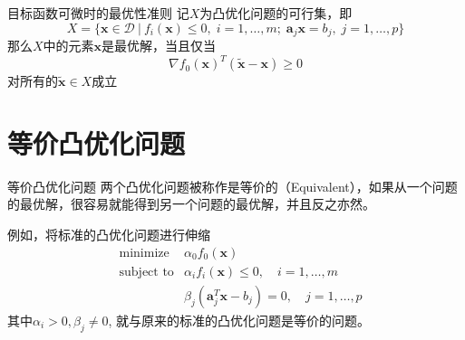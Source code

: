 
\begin{frame}

\begin{block}{目标函数可微时的最优性准则}
记$X$为凸优化问题的可行集，即
\[X = \{ \mathbf{x} \in \mathcal{D} \ |\ f_i(\mathbf{x}) \le 0, \; i = 1,\ldots,m;\; \mathbf{a}_j\mathbf{x} = b_j, \; j=1,\ldots,p \}\]
那么$X$中的元素$\mathbf{x}$是最优解，当且仅当
\[\nabla f_0(\mathbf{x})^T(\widetilde{\mathbf{x}} - \mathbf{x}) \ge 0\]
对所有的$\widetilde{\mathbf{x}} \in X$成立
\end{block}

\end{frame}


\section{等价凸优化问题}


\begin{frame}

\begin{block}{等价凸优化问题}
两个凸优化问题被称作是等价的（Equivalent），如果从一个问题的最优解，很容易就能得到另一个问题的最优解，并且反之亦然。
\end{block}

\vspace{1em}

例如，将标准的凸优化问题进行伸缩
\begin{eqnarray*}
& \text{minimize} & \alpha_0f_0(\mathbf{x}) \\
& \text{subject to} & \alpha_i f_i(\mathbf{x}) \le 0, \quad i = 1,\ldots,m \\
& & \beta_j(\mathbf{a}_j^T\mathbf{x} - b_j) = 0, \quad j = 1,\ldots,p
\end{eqnarray*}
其中$\alpha_i > 0, \beta_j\neq 0$, 就与原来的标准的凸优化问题是等价的问题。
\end{frame}


